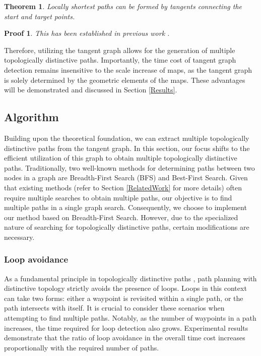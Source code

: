 \documentclass[lettersize,journal]{IEEEtran}
\newtheorem{myTheo}{Theorem}
\newtheorem{myProof}{Proof}
\begin{document}
\begin{myTheo}
Locally shortest paths can be formed by tangents connecting the start and target points.
\end{myTheo}

\begin{myProof}
This has been established in previous work \cite{131594, oh2017edge, yao2019reinforcedrimjump}.
\end{myProof}


Therefore, utilizing the tangent graph allows for the generation of multiple topologically distinctive paths. Importantly, the time cost of tangent graph detection remains insensitive to the scale increase of maps, as the tangent graph is solely determined by the geometric elements of the maps. These advantages will be demonstrated and discussed in Section \ref{Results}.


\subsection{Algorithm}

Building upon the theoretical foundation, we can extract multiple topologically distinctive paths from the tangent graph. In this section, our focus shifts to the efficient utilization of this graph to obtain multiple topologically distinctive paths. Traditionally, two well-known methods for determining paths between two nodes in a graph are Breadth-First Search (BFS) and Best-First Search. Given that existing methods (refer to Section \ref{RelatedWork} for more details) often require multiple searches to obtain multiple paths, our objective is to find multiple paths in a single graph search. Consequently, we choose to implement our method based on Breadth-First Search. However, due to the specialized nature of searching for topologically distinctive paths, certain modifications are necessary.

\subsubsection{Loop avoidance}

As a fundamental principle in topologically distinctive paths \cite{bhattacharya2012topological}, path planning with distinctive topology strictly avoids the presence of loops. Loops in this context can take two forms: either a waypoint is revisited within a single path, or the path intersects with itself. It is crucial to consider these scenarios when attempting to find multiple paths. Notably, as the number of waypoints in a path increases, the time required for loop detection also grows. Experimental results demonstrate that the ratio of loop avoidance in the overall time cost increases proportionally with the required number of paths.
\end{document}

